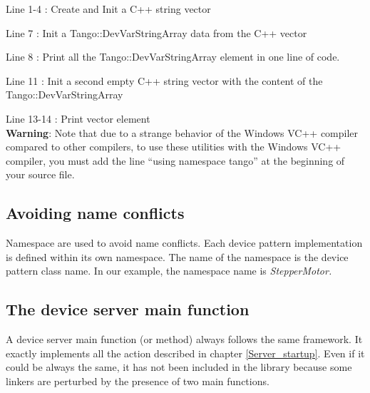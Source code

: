 Line 1-4 : Create and Init a C++ string vector

Line 7 : Init a Tango::DevVarStringArray data from the C++ vector

Line 8 : Print all the Tango::DevVarStringArray element in one line
of code.

Line 11 : Init a second empty C++ string vector with the content of
the Tango::DevVarStringArray

Line 13-14 : Print vector element\\


\textbf{Warning}: Note that due to a strange behavior of the Windows
VC++ compiler compared to other compilers, to use these utilities
with the Windows VC++ compiler, you must add the line ``using namespace
tango'' at the beginning of your source file.


\subsection{Avoiding name conflicts}

Namespace are used to avoid name conflicts. Each device pattern implementation
is defined within its own namespace. The name of
the namespace is the device pattern class name. In our example, the
namespace name is \emph{StepperMotor.}


\subsection{The device server main function}

A device server main function (or method) always follows
the same framework. It exactly implements all the action described
in chapter \ref{Server_startup}. Even if it could be always the same,
it has not been included in the library because some linkers are perturbed
by the presence of two main functions.




